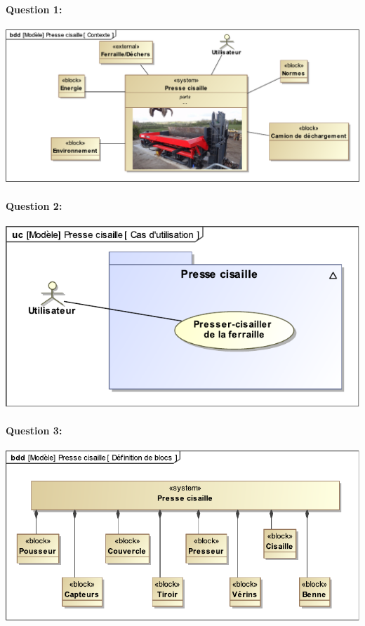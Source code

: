 \paragraph{Question 1:}

\begin{center}
 \includegraphics[width=0.8\linewidth]{img/contexte_corrige}
\end{center}

\paragraph{Question 2:}

\begin{center}
 \includegraphics[width=0.8\linewidth]{img/use_case_corrige}
\end{center}

\paragraph{Question 3:}

\begin{center}
 \includegraphics[width=0.8\linewidth]{img/BDD_corrige}
\end{center}

